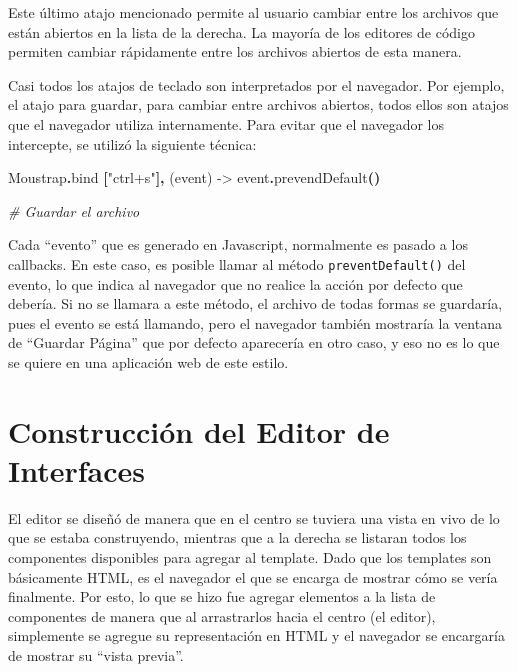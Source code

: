 \documentclass[12pt,spanish,letter]{report}
\newenvironment{Shaded}{}{}
\newcommand{\KeywordTok}[1]{\textcolor[rgb]{0.00,0.44,0.13}{\textbf{{#1}}}}
\newcommand{\StringTok}[1]{\textcolor[rgb]{0.25,0.44,0.63}{{#1}}}
\newcommand{\CommentTok}[1]{\textcolor[rgb]{0.38,0.63,0.69}{\textit{{#1}}}}
\newcommand{\FunctionTok}[1]{\textcolor[rgb]{0.02,0.16,0.49}{{#1}}}
\newcommand{\NormalTok}[1]{{#1}}
\begin{document}
Este último atajo mencionado permite al usuario cambiar entre los
archivos que están abiertos en la lista de la derecha. La mayoría de los
editores de código permiten cambiar rápidamente entre los archivos
abiertos de esta manera.

Casi todos los atajos de teclado son interpretados por el navegador. Por
ejemplo, el atajo para guardar, para cambiar entre archivos abiertos,
todos ellos son atajos que el navegador utiliza internamente. Para
evitar que el navegador los intercepte, se utilizó la siguiente técnica:

\begin{Shaded}
\begin{Highlighting}[]
\NormalTok{Moustrap}\KeywordTok{.}\NormalTok{bind }\KeywordTok{[}\StringTok{"ctrl+s"}\KeywordTok{],} \FunctionTok{(event) ->}
  \NormalTok{event}\KeywordTok{.}\NormalTok{prevendDefault}\KeywordTok{()}
  
  \CommentTok{# Guardar el archivo}
\end{Highlighting}
\end{Shaded}

Cada ``evento'' que es generado en Javascript, normalmente es pasado a
los callbacks. En este caso, es posible llamar al método
\texttt{preventDefault()} del evento, lo que indica al navegador que no
realice la acción por defecto que debería. Si no se llamara a este
método, el archivo de todas formas se guardaría, pues el evento se está
llamando, pero el navegador también mostraría la ventana de ``Guardar
Página'' que por defecto aparecería en otro caso, y eso no es lo que se
quiere en una aplicación web de este estilo.

\section{Construcción del Editor de Interfaces}

\label{section:interface-editor}

El editor se diseñó de manera que en el centro se tuviera una vista en
vivo de lo que se estaba construyendo, mientras que a la derecha se
listaran todos los componentes disponibles para agregar al template.
Dado que los templates son básicamente HTML, es el navegador el que se
encarga de mostrar cómo se vería finalmente. Por esto, lo que se hizo
fue agregar elementos a la lista de componentes de manera que al
arrastrarlos hacia el centro (el editor), simplemente se agregue su
representación en HTML y el navegador se encargaría de mostrar su
``vista previa''.
\end{document}

